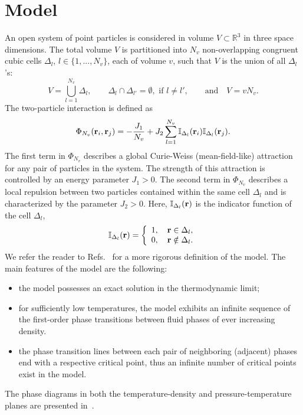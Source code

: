 \documentclass[entropy,article,submit,pdftex,moreauthors]{Definitions/mdpi}
\begin{document}
\section{Model}
An open system of point particles is considered in volume $V\subset\mathbb R^3$ in three space dimensions. The total volume $V$ is partitioned into $N_v$ non-overlapping congruent cubic cells $\Delta_l$, $l\in\{1,...,N_v\}$, each of volume $v$, such that $V$ is the union of all $\Delta_l$'s:
\begin{equation}\label{volume}
	V = \bigcup_{l=1}^{N_v}\Delta_l,\qquad
	\Delta_l \cap \Delta_{l'} = \emptyset, \text{ if } l \neq l',\qquad\mbox{and}\quad
	V = v N_v.
\end{equation}
The two-particle interaction is defined as
\begin{equation}
	\label{def:curie-weiss-pot}
	\Phi_{N_v}(\vb{r}_i, \vb{r}_j) = -\frac{J_1}{N_v} + J_2\sum_{l=1}^{N_v} \mathbb{I}_{\Delta_l}(\vb{r}_i) \mathbb{I}_{\Delta_l}(\vb{r}_j).
\end{equation}
The first term in $\Phi_{N_v}$ describes a global Curie-Weiss (mean-field-like) attraction for any pair of particles in the system.
The strength of this attraction is controlled by an energy parameter $J_1 > 0$. The second term in $\Phi_{N_v}$ describes a local repulsion between two particles contained within the same cell $\Delta_l$ and is characterized by the parameter $J_2 > 0.$
Here, $\mathbb{I}_{\Delta_l}(\vb{r})$ is the indicator function of the cell $\Delta_l$,
\begin{equation}
	\label{def:I}
	\mathbb{I}_{\Delta_l} (\vb{r}) = \left\{
	\begin{array}{ll}
		1, \quad \vb{r} \in \Delta_l,
		\\
		0, \quad \vb{r} \notin \Delta_l.
	\end{array}
	\right.
\end{equation}
We refer the reader to Refs.~\citep{KKD20,KD22,RDKPS25arxiv} for a more rigorous definition of the model. The main features of the model are the following:
\begin{itemize}
	\item the model possesses an exact solution in the thermodynamic limit;
	
	\item for sufficiently low temperatures, the model exhibits an infinite sequence of the first-order phase transitions between fluid phases of ever increasing density.
	
	\item the phase transition lines between each pair of neighboring (adjacent) phases end with a respective critical point, thus an infinite number of critical points exist in the model.
	
\end{itemize}
The phase diagrams in both the temperature-density and pressure-temperature planes are presented in~\citep{KD22}.
\end{document}
